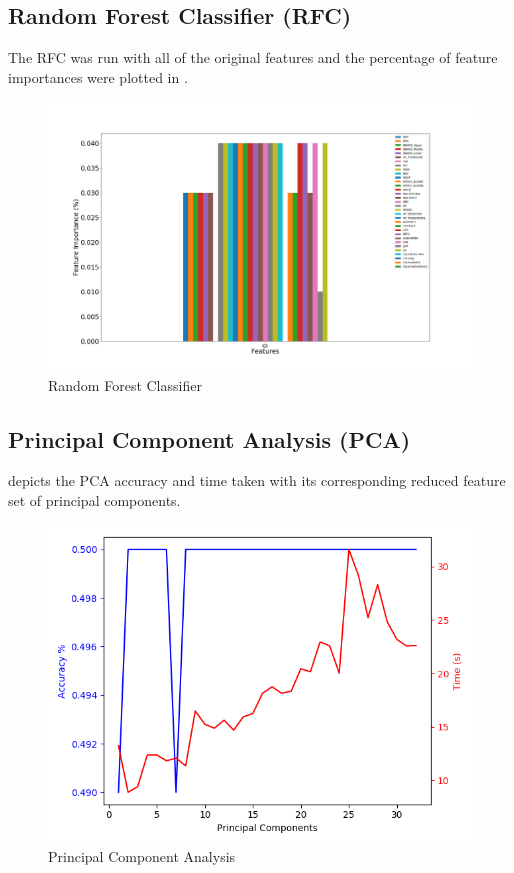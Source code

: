\documentclass{article}\raggedbottom
\begin{document}
\subsection{Random Forest Classifier (RFC)}

The RFC was run with all of the original features and the percentage of feature importances were plotted in .

\begin{figure}[H]
	\centering
	\includegraphics[width=\linewidth]{data/RFC_importancesT1.png}
	\caption{Random Forest Classifier}
	\label{fig:RFC}
\end{figure}

\subsection{Principal Component Analysis (PCA)}
 depicts the PCA accuracy and time taken with its corresponding reduced feature set of principal components.

\begin{figure}[h!]
	\centering
	\includegraphics[width=\linewidth]{data/PCAT1.png}
	\caption{Principal Component Analysis}
	\label{fig:PCA}
\end{figure}
\end{document}
